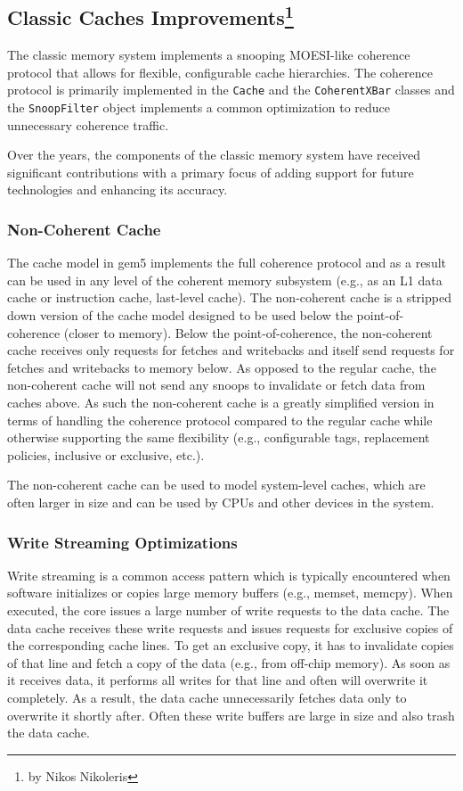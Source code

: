\subsection[Classic Caches Improvements]{Classic Caches Improvements\footnote{by Nikos Nikoleris}}
\label{sec:classic}

The classic memory system implements a snooping MOESI-like coherence protocol that allows for flexible, configurable cache hierarchies.
The coherence protocol is primarily implemented in the \verb|Cache| and the \verb|CoherentXBar| classes and the \verb|SnoopFilter| object implements a common optimization to reduce unnecessary coherence traffic.

Over the years, the components of the classic memory system have received significant contributions with a primary focus of adding support for future technologies and enhancing its accuracy.

\subsubsection[Non-Coherent Cache]{Non-Coherent Cache}
The cache model in gem5 implements the full coherence protocol and as a result can be used in any level of the coherent memory subsystem (e.g., as an L1 data cache or instruction cache, last-level cache).
The non-coherent cache is a stripped down version of the cache model designed to be used below the point-of-coherence (closer to memory).
Below the point-of-coherence, the non-coherent cache receives only requests for fetches and writebacks and itself send requests for fetches and writebacks to memory below.
As opposed to the regular cache, the non-coherent cache will not send any snoops to invalidate or fetch data from caches above.
As such the non-coherent cache is a greatly simplified version in terms of handling the coherence protocol compared to the regular cache while otherwise supporting the same flexibility (e.g., configurable tags, replacement policies, inclusive or exclusive, etc.).

The non-coherent cache can be used to model system-level caches, which are often larger in size and can be used by CPUs and other devices in the system.

\subsubsection[Write Streaming Optimizations]{Write Streaming Optimizations}

Write streaming is a common access pattern which is typically encountered when software initializes or copies large memory buffers (e.g., memset, memcpy).
When executed, the core issues a large number of write requests to the data cache. The data cache receives these write requests and issues requests for exclusive copies of the corresponding cache lines. To get an exclusive copy, it has to invalidate copies of that line and fetch a copy of the data (e.g., from off-chip memory). As soon as it receives data, it performs all writes for that line and often will overwrite it completely. As a result, the data cache unnecessarily fetches data only to overwrite it shortly after. Often these write buffers are large in size and also trash the data cache.

